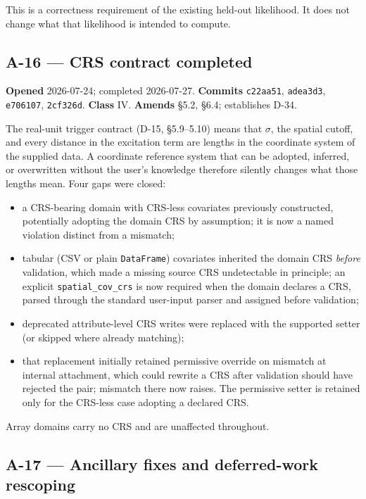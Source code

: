 \documentclass[
  10pt,
]{article}
\providecommand{\tightlist}{%
  \setlength{\itemsep}{0pt}\setlength{\parskip}{0pt}}
\begin{document}
This is a correctness requirement of the existing held-out likelihood. It does not change what that likelihood is intended to compute.

\hypertarget{a-16}{%
\subsection{A-16 --- CRS contract completed}\label{a-16}}

\textbf{Opened} 2026-07-24; completed 2026-07-27. \textbf{Commits} \texttt{c22aa51}, \texttt{adea3d3}, \texttt{e706107}, \texttt{2cf326d}. \textbf{Class} IV. \textbf{Amends} §5.2, §6.4; establishes D-34.

The real-unit trigger contract (D-15, §5.9--5.10) means that \(\sigma\), the spatial cutoff, and every distance in the excitation term are lengths in the coordinate system of the supplied data. A coordinate reference system that can be adopted, inferred, or overwritten without the user's knowledge therefore silently changes what those lengths mean. Four gaps were closed:

\begin{itemize}
\tightlist
\item
  a CRS-bearing domain with CRS-less covariates previously constructed, potentially adopting the domain CRS by assumption; it is now a named violation distinct from a mismatch;
\item
  tabular (CSV or plain \texttt{DataFrame}) covariates inherited the domain CRS \emph{before} validation, which made a missing source CRS undetectable in principle; an explicit \texttt{spatial\_cov\_crs} is now required when the domain declares a CRS, parsed through the standard user-input parser and assigned before validation;
\item
  deprecated attribute-level CRS writes were replaced with the supported setter (or skipped where already matching);
\item
  that replacement initially retained permissive override on mismatch at internal attachment, which could rewrite a CRS after validation should have rejected the pair; mismatch there now raises. The permissive setter is retained only for the CRS-less case adopting a declared CRS.
\end{itemize}

Array domains carry no CRS and are unaffected throughout.

\hypertarget{a-17}{%
\subsection{A-17 --- Ancillary fixes and deferred-work rescoping}\label{a-17}}
\end{document}
